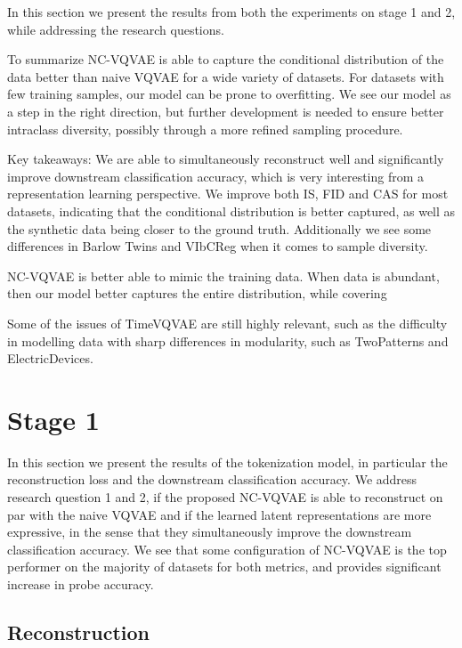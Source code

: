 \documentclass[../../thesis.tex]{subfiles}
\begin{document}
In this section we present the results from both the experiments on stage 1 and 2, while addressing the research questions. \newline

To summarize NC-VQVAE is able to capture the conditional distribution of the data better than naive VQVAE for a wide variety of datasets. For datasets with few training samples, our model can be prone to overfitting. We see our model as a step in the right direction, but further development is needed to ensure better intraclass diversity, possibly through a more refined sampling procedure. \newline

Key takeaways: We are able to simultaneously reconstruct well and significantly improve downstream classification accuracy, which is very interesting from a representation learning perspective. We improve both IS, FID and CAS for most datasets, indicating that the conditional distribution is better captured, as well as the synthetic data being closer to the ground truth. Additionally we see some differences in Barlow Twins and VIbCReg when it comes to sample diversity.\newline

NC-VQVAE is better able to mimic the training data. When data is abundant, then our model better captures the entire distribution, while covering \newline

Some of the issues of TimeVQVAE are still highly relevant, such as the difficulty in modelling data with sharp differences in modularity, such as TwoPatterns and ElectricDevices.

\section{Stage 1}
In this section we present the results of the tokenization model, in particular the reconstruction loss and the downstream classification accuracy. We address research question 1 and 2, if the proposed NC-VQVAE is able to reconstruct on par with the naive VQVAE and if the learned latent representations are more expressive, in the sense that they simultaneously improve the downstream classification accuracy. We see that some configuration of NC-VQVAE is the top performer on the majority of datasets for both metrics, and provides significant increase in probe accuracy. 

\subsection{Reconstruction}
\end{document}
